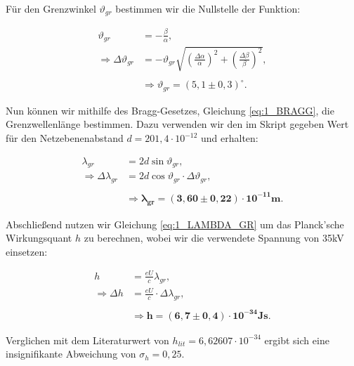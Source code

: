 \documentclass{article}
\begin{document}
Für den Grenzwinkel $\vartheta_{gr}$ bestimmen wir die Nullstelle der Funktion:

\begin{equation}
    \begin{split}
        \vartheta_{gr} &= - \frac{\beta}{\alpha}, \\
        \Rightarrow \Delta \vartheta_{gr} &= -\vartheta_{gr} \sqrt{\left( \frac{\Delta \alpha}{\alpha} \right)^2 + \left( \frac{\Delta \beta}{\beta} \right)^2}, \\ \\
        &\Rightarrow \vartheta_{gr} = (5,1 \pm 0,3)^\circ.
    \end{split}
\end{equation}

Nun können wir mithilfe des Bragg-Gesetzes, Gleichung \ref{eq:1_BRAGG}, die Grenzwellenlänge bestimmen. Dazu verwenden wir den im Skript gegeben Wert für den Netzebenenabstand $d = 201,4 \cdot 10^{-12}$ und erhalten:

\begin{equation}
    \begin{split}
        \lambda_{gr} &= 2 d \sin{\vartheta_{gr}}, \\
        \Rightarrow \Delta \lambda_{gr} &= 2 d \cos{\vartheta_{gr}} \cdot \Delta \vartheta_{gr}, \\ \\
        &\Rightarrow \bm{\lambda_{gr} = (3,60 \pm 0,22) \cdot 10^{-11}} \textbf{m}.
    \end{split}
\end{equation}

Abschließend nutzen wir Gleichung \ref{eq:1_LAMBDA_GR} um das Planck'sche Wirkungsquant $h$ zu berechnen, wobei wir die verwendete Spannung von 35kV einsetzen:

\begin{equation}
    \begin{split}
        h &= \frac{ e U}{c} \lambda_{gr}, \\
        \Rightarrow \Delta h &= \frac{e U}{c} \cdot \Delta \lambda_{gr}, \\ \\
        &\Rightarrow \bm{h = (6,7 \pm 0,4) \cdot 10^{-34}} \textbf{Js}.  
    \end{split}
\end{equation}

Verglichen mit dem Literaturwert von $h_{lit} = 6,62607 \cdot 10^{-34}$ ergibt sich eine insignifikante Abweichung von $\sigma_h = 0,25$. 
\end{document}
